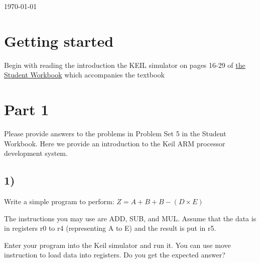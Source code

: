 \documentclass[letterpaper,12pt,titlepage]{article}
\begin{document}
\begin{titlepage}

{\large \today}\\[3cm] %


 

\vfill %

\end{titlepage}


\section*{Getting started}
Begin with reading the introduction the KEIL simulator on pages 16-29 of \href{http://academic.cengage.com/resource_uploads/downloads/1111987041_374273.pdf}{the Student Workbook}  which accompanies the textbook 

\section*{Part 1}
Please provide answers to the problems in Problem Set 5 in the Student Workbook. Here we provide an introduction to the Keil ARM processor development system.


\subsection*{1)} Write a simple program to perform:  $Z = A+B+B-(D \times E)$

The instructions you may use are ADD, SUB, and MUL. Assume that the data is in registers r0 to r4 (representing A to E) and the result is put in r5. 

Enter your program into the Keil simulator and run it. You can use move instruction to load data into registers. Do you
get the expected answer? 
\end{document}
